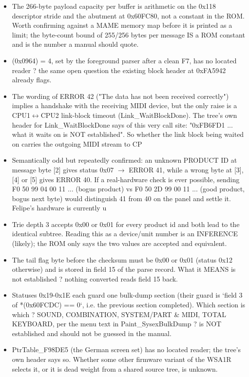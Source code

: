 \begin{itemize}
\item The 266-byte payload capacity per buffer is arithmetic on the 0x118 descriptor stride and the abutment at 0x60FC80, not a constant in the ROM. Worth confirming against a MAME memory map before it is printed as a limit; the byte-count bound of 255/256 bytes per message IS a ROM constant and is the number a manual should quote.
\item (0x0964) = 4, set by the foreground parser after a clean F7, has no located reader ? the same open question the existing block header at 0xFA5942 already flags.
\item The wording of ERROR 42 ("The data has not been received correctly") implies a handshake with the receiving MIDI device, but the only raise is a CPU1$\leftrightarrow$CPU2 link-block timeout (Link\_WaitBlockDone). The tree's own header for Link\_WaitBlockDone says of this very call site: "0xFB6FD1 ... what it waits on is NOT established". So whether the link block being waited on carries the outgoing MIDI stream to CP
\item Semantically odd but repeatedly confirmed: an unknown PRODUCT ID at message byte [2] gives status 0x07 $\rightarrow$ ERROR 41, while a wrong byte at [3], [4] or [5] gives ERROR 40. If a real-hardware check is ever possible, sending F0 50 99 04 00 11 ... (bogus product) vs F0 50 2D 99 00 11 ... (good product, bogus next byte) would distinguish 41 from 40 on the panel and settle it. Felipe's hardware is currently u
\item Trie depth 3 accepts 0x00 or 0x01 for every product id and both lead to the identical subtree. Reading this as a device/unit number is an INFERENCE (likely); the ROM only says the two values are accepted and equivalent.
\item The tail flag byte before the checksum must be 0x00 or 0x01 (status 0x12 otherwise) and is stored in field 15 of the parse record. What it MEANS is not established ? nothing converted reads field 15 back.
\item Statuses 0x19-0x1E each guard one bulk-dump section (their guard is `field 3 of *(0x60FCDC) == 0`, i.e. the previous section completed). Which section is which ? SOUND, COMBINATION, SYSTEM/PART \& MIDI, TOTAL KEYBOARD, per the menu text in Paint\_SysexBulkDump ? is NOT established and should not be guessed in the manual.
\item PtrTable\_F98DE5 (the German screen set) has no located reader; the tree's own header says so. Whether some other firmware variant of the WSA1R selects it, or it is dead weight from a shared source tree, is unknown.

\end{itemize}
